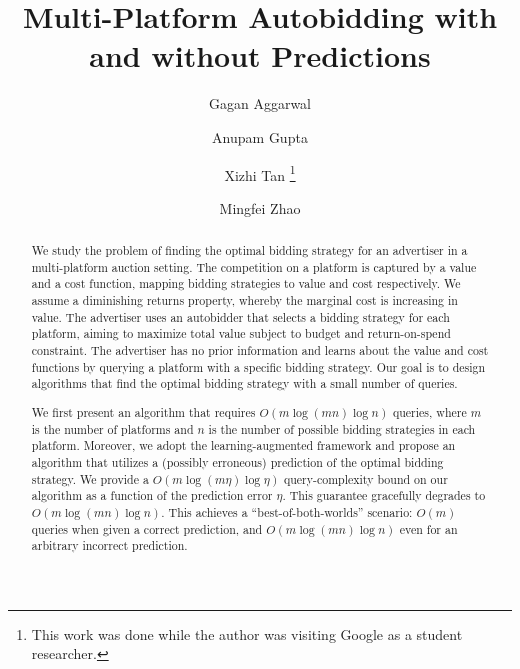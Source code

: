 \documentclass[letterpaper, 11pt]{article}
\title{Multi-Platform Autobidding with and without Predictions}
\author[a]{Gagan Aggarwal}
\author[b]{Anupam Gupta}
\author[c]{Xizhi Tan \thanks{This work was done while the author was visiting Google as a student researcher.}}
\author[a]{Mingfei Zhao}
\affil[a]{Google Research: \texttt{{\{gagana, mingfei\}@google.com}}}
\affil[b]{New York University: \texttt{anupam.g@nyu.edu}}
\affil[c]{Drexel University: \texttt{xizhi@drexel.edu}}
\date{}
\begin{document}
\begin{titlepage}

\maketitle


\begin{abstract}
We study the problem of finding the optimal bidding strategy for an advertiser in a multi-platform auction setting. The competition on a platform is captured by a value and a cost function, mapping bidding strategies to value and cost respectively. We assume a diminishing returns property, whereby the marginal cost is increasing in value. The advertiser uses an autobidder that selects a bidding strategy for each platform, aiming to maximize total value subject to budget and return-on-spend constraint. The advertiser
has no prior information and learns about the value and cost functions by querying a platform with a specific bidding strategy. Our goal is to design algorithms that find the optimal bidding strategy with a small number of queries.

We first present an algorithm that requires \(O(m \log (mn) \log n)\) queries, where $m$ is the number of platforms and $n$ is 
the number of possible bidding strategies in each platform. 
Moreover, we adopt the learning-augmented framework and propose an algorithm that utilizes a (possibly erroneous) prediction of the optimal bidding strategy. We provide a $O(m \log (m\eta) \log \eta)$ query-complexity bound on our algorithm as a function of the prediction error $\eta$. This guarantee gracefully degrades to \(O(m \log (mn) \log n)\). This achieves a ``best-of-both-worlds'' scenario: \(O(m)\) queries when given a correct prediction, and \(O(m \log (mn) \log n)\) even for an arbitrary incorrect prediction.

\end{abstract}
\thispagestyle{empty} 
\end{titlepage}











% 






\end{document}
